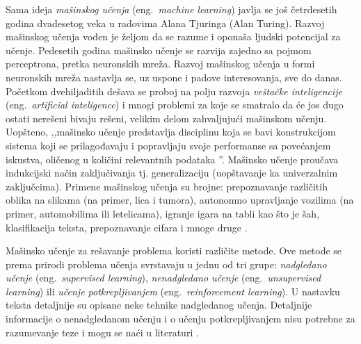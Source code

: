 \documentclass[12pt,oneside]{memoir}
\begin{document}
Sama ideja \textit{mašinskog učenja} (eng.~\textit{machine learning}) javlja se još četrdesetih godina dvadesetog veka u radovima Alana Tjuringa (Alan Turing). Razvoj mašinskog učenja vođen je željom da se razume i oponaša ljudski potencijal za učenje. Pedesetih godina mašinsko učenje se razvija zajedno sa pojmom perceptrona, pretka neuronskih mreža. %
Razvoj mašinskog učenja u formi neuronskih mreža nastavlja se, uz uspone i padove interesovanja, sve do danas. Početkom dvehiljaditih dešava se proboj na polju razvoja \textit{veštačke inteligencije} (eng.~\textit{artificial inteligence}) i mnogi problemi za koje se smatralo da će jos dugo ostati nerešeni bivaju rešeni, velikim delom zahvaljujući mašinskom učenju. Uopšteno, ,,mašinsko učenje predstavlja disciplinu koja se bavi konstrukcijom sistema koji se prilagođavaju i popravljaju svoje performanse sa povećanjem iskustva, oličenog u količini relevantnih podataka \cite{mladen}''. Mašinsko učenje proučava indukcijski način zaključivanja tj. generalizaciju (uopštavanje ka univerzalnim zaključcima). Primene mašinskog učenja su brojne: prepoznavanje različitih oblika na slikama (na primer, lica i tumora), autonomno upravljanje vozilima (na primer, automobilima ili letelicama), igranje igara na tabli kao što je šah, klasifikacija teksta, prepoznavanje cifara i mnoge druge \cite{mladen}.

Mašinsko učenje za rešavanje problema koristi različite metode. Ove metode se prema prirodi problema učenja svrstavaju u jednu od tri grupe: \textit{nadgledano učenje} (eng.~\textit{supervised learning}), \textit{nenadgledano učenje} (eng.~\textit{unsupervised learning}) ili \textit{učenje potkrepljivanjem} (eng.~\textit{reinforcement learning}). U nastavku teksta detaljnije su opisane neke tehnike nadgledanog učenja. Detaljnije informacije o nenadgledanom učenju i o učenju potkrepljivanjem nisu potrebne za razumevanje teze i mogu se naći u literaturi \cite{mlm, reinforcement-learning, mladen}.

\end{document}
